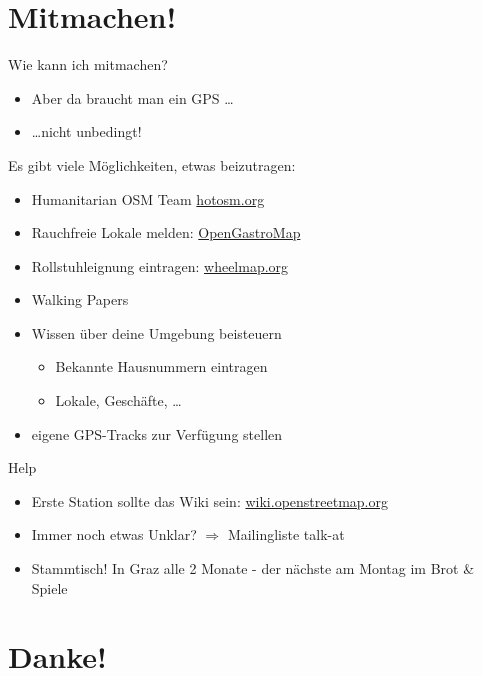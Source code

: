 \documentclass{beamer}
\begin{document}
\section{Mitmachen!}

\begin{frame}{Wie kann ich mitmachen?}

\begin{itemize}
  \item Aber da braucht man ein GPS \dots
  \pause
  \item \dots nicht unbedingt!
\end{itemize}

Es gibt viele Möglichkeiten, etwas beizutragen:

\begin{itemize}
  \item Humanitarian OSM Team \href{http://tasks.hotosm.org}{hotosm.org}
  \item Rauchfreie Lokale melden: \href{http://OpenGastroMap.org}{OpenGastroMap}
  \item Rollstuhleignung eintragen: \href{http://wheelmap.org}{wheelmap.org}
  \item Walking Papers
  \item Wissen über deine Umgebung beisteuern
    \begin{itemize}
      \item Bekannte Hausnummern eintragen
      \item Lokale, Geschäfte, \dots
    \end{itemize}
  \item eigene GPS-Tracks zur Verfügung stellen
\end{itemize}

\end{frame}


\begin{frame}{Help}

\begin{itemize}
  \item Erste Station sollte das Wiki sein: \url{wiki.openstreetmap.org}
  \item Immer noch etwas Unklar? $\Rightarrow$ Mailingliste talk-at
  \pause
  \item Stammtisch! In Graz alle 2 Monate - der nächste am Montag im Brot \& Spiele
\end{itemize}

\end{frame}

\section{Danke!}
\end{document}
